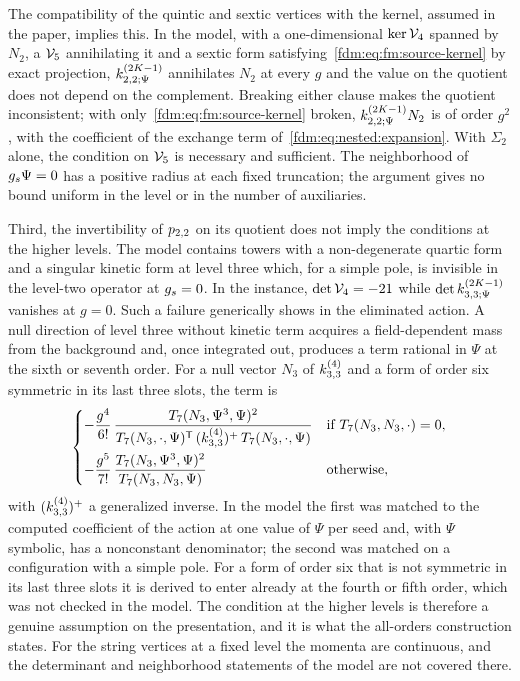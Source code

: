 The compatibility of the quintic and sextic vertices with the kernel, assumed in the paper, implies this.
In the model, with a one-dimensional $\ker \mathcal{V}_{4}$ spanned by $N_2$, a $\mathcal{V}_{5}$ annihilating it and a sextic form satisfying~\eqref{fdm:eq:fm:source-kernel} by exact projection, $\kin{2}{\Psi}{2 K - 1}$ annihilates $N_2$ at every $g$ and the value on the quotient does not depend on the complement.
Breaking either clause makes the quotient inconsistent; with only~\eqref{fdm:eq:fm:source-kernel} broken, $\kin{2}{\Psi}{2 K - 1} N_2$ is of order $g^2$, with the coefficient of the exchange term of~\eqref{fdm:eq:nested:expansion}.
With $\Sigma_2$ alone, the condition on $\mathcal{V}_{5}$ is necessary and sufficient.
The neighborhood of $g_s \Psi = 0$ has a positive radius at each fixed truncation; the argument gives no bound uniform in the level or in the number of auxiliaries.

Third, the invertibility of $p_{2,2}$ on its quotient does not imply the conditions at the higher levels.
The model contains towers with a non-degenerate quartic form and a singular kinetic form at level three which, for a simple pole, is invisible in the level-two operator at $g_s = 0$.
In the instance, $\det \mathcal{V}_{4} = -21$ while $\det \kin{3}{\Psi}{2 K - 1}$ vanishes at $g = 0$.
Such a failure generically shows in the eliminated action.
A null direction of level three without kinetic term acquires a field-dependent mass from the background and, once integrated out, produces a term rational in $\Psi$ at the sixth or seventh order.
For a null vector $N_3$ of $\kin{3}{}{4}$ and a form of order six symmetric in its last three slots, the term is
\begin{equation}
  \label{fdm:eq:nested:rational}
  \begin{cases}
    \displaystyle
    - \frac{g^4}{6!} \, \frac{T_7(N_3, \Psi^3, \Psi)^2}{T_7(N_3, \cdot, \Psi)^{\mathsf T} \, (\kin{3}{}{4})^{+} \, T_7(N_3, \cdot, \Psi)}
      & \text{if } T_7(N_3, N_3, \cdot) = 0,
    \\[3ex]
    \displaystyle
    - \frac{g^5}{7!} \, \frac{T_7(N_3, \Psi^3, \Psi)^2}{T_7(N_3, N_3, \Psi)}
      & \text{otherwise},
  \end{cases}
\end{equation}
with $(\kin{3}{}{4})^{+}$ a generalized inverse.
In the model the first was matched to the computed coefficient of the action at one value of $\Psi$ per seed and, with $\Psi$ symbolic, has a nonconstant denominator; the second was matched on a configuration with a simple pole.
For a form of order six that is not symmetric in its last three slots it is derived to enter already at the fourth or fifth order, which was not checked in the model.
The condition at the higher levels is therefore a genuine assumption on the presentation, and it is what the all-orders construction states.
For the string vertices at a fixed level the momenta are continuous, and the determinant and neighborhood statements of the model are not covered there.

